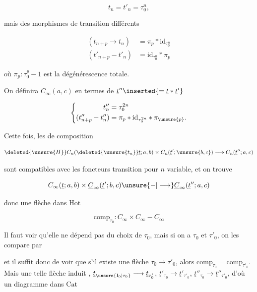 \[
t_n=t'_n=\tau_0^n,
\]

mais des morphismes de transition différents

\[
\begin{aligned}
(t_{n+p}\longrightarrow t_n)&=\pi_p*\mathrm{id}_{\tau_0^n}\\
(t'_{n+p}-t'_n)&=\mathrm{id}_{\tau_0^n}*\pi_p
\end{aligned}
\]

où $\pi_p:\tau_0^p-1$ est la  dégénérescence totale.

On  définira $C_\infty(a,c)$ en termes de $\underline t''\inserted{=\underline t*\underline t'}$

\[
\left\{\begin{aligned}
t''_n&=\tau_0^{2n}\\
(t''_{n+p}-t''_n)&=\pi_p*\mathrm{id}_{\tau_0^{2n}}*\pi_{\unsure{p}}.
\end{aligned}\right.
\]

Cette fois, les   de composition

\[
\deleted{\unsure{H}}C_n(\deleted{\unsure{t_n}}\underline t;a,b)\times C_n(\underline t';\unsure{b,c})\longrightarrow C_n(\underline t'';a,c)
\]

sont compatibles avec les foncteurs transition pour $n$ variable, et on trouve


\[
C_\infty(\underline t;a,b)\times\underline C_\infty(\underline t';b,c)\unsure{-|\longrightarrow}\underline C_\infty(\underline t'';a,c)
\]

donc une flèche dans $\mathrm{Hot}$

\[
\mathrm{comp}_{\tau_0}:C_\infty\times C_\infty- C_\infty
\]

Il faut voir qu'elle ne dépend pas du choix de $\tau_0$, mais si on a $\tau_0$ et $\tau'_0$, on les compare par


et il suffit donc de voir que s'il existe une flèche $\tau_0\longrightarrow\tau'_0$, alors $\mathrm{comp}_{\tau_0}=\mathrm{comp}_{\tau'_0}$. Mais une telle flèche induit   , $\underline t_{\unsure{\mathrm I_0|\tau_0}}\longrightarrow\underline t_{\tau'_0}$, $\underline t'_{\tau_0}\longrightarrow\underline t'_{\tau'_0}$, $\underline t''_{\tau_0}\longrightarrow\underline t''_{\tau'_0}$, d'où un diagramme dans $\mathrm{Cat}$

